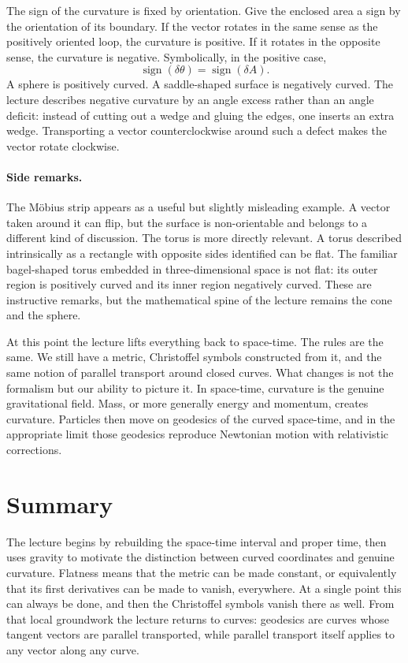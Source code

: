 The sign of the curvature is fixed by orientation. Give the enclosed area a sign by the orientation of its boundary. If the vector rotates in the same sense as the positively oriented loop, the curvature is positive. If it rotates in the opposite sense, the curvature is negative. Symbolically, in the positive case,
\begin{equation}
\operatorname{sign}(\delta\theta)=\operatorname{sign}(\delta A).
\end{equation}
A sphere is positively curved. A saddle-shaped surface is negatively curved. The lecture describes negative curvature by an angle excess rather than an angle deficit: instead of cutting out a wedge and gluing the edges, one inserts an extra wedge. Transporting a vector counterclockwise around such a defect makes the vector rotate clockwise.

\paragraph{Side remarks.}
The Möbius strip appears as a useful but slightly misleading example. A vector taken around it can flip, but the surface is non-orientable and belongs to a different kind of discussion. The torus is more directly relevant. A torus described intrinsically as a rectangle with opposite sides identified can be flat. The familiar bagel-shaped torus embedded in three-dimensional space is not flat: its outer region is positively curved and its inner region negatively curved. These are instructive remarks, but the mathematical spine of the lecture remains the cone and the sphere.

At this point the lecture lifts everything back to space-time. The rules are the same. We still have a metric, Christoffel symbols constructed from it, and the same notion of parallel transport around closed curves. What changes is not the formalism but our ability to picture it. In space-time, curvature is the genuine gravitational field. Mass, or more generally energy and momentum, creates curvature. Particles then move on geodesics of the curved space-time, and in the appropriate limit those geodesics reproduce Newtonian motion with relativistic corrections.

\section{Summary}

The lecture begins by rebuilding the space-time interval and proper time, then uses gravity to motivate the distinction between curved coordinates and genuine curvature. Flatness means that the metric can be made constant, or equivalently that its first derivatives can be made to vanish, everywhere. At a single point this can always be done, and then the Christoffel symbols vanish there as well. From that local groundwork the lecture returns to curves: geodesics are curves whose tangent vectors are parallel transported, while parallel transport itself applies to any vector along any curve.

